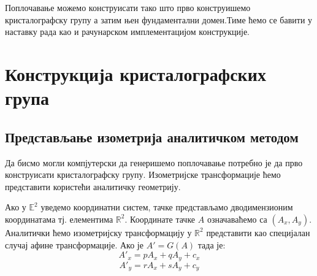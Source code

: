\documentclass[12pt]{article}
\newtheorem{definition}[theorem]{\bf Дефиниција}
\begin{document}
Поплочавање можемо конструисати тако што прво конструишемо кристалографску групу а затим њен фундаментални домен.Тиме ћемо се бавити у наставку рада као и рачунарском имплементацијом конструкције.






    \section{\texorpdfstring{Конструкција кристалографских група
}{Izometrijske transformacije u \textbackslash{}mathbb\{Е\}\^{}2}}\label{izometrijske-transformacije-u-mathbbr2}
\subsection{Представљање изометрија аналитичком методом}

Да бисмо могли компјутерски да генеришемо поплочавање потребно је да прво конструисати кристалографску групу. Изометријске трансформације ћемо представити користећи аналитичку геометрију.




    Ако у \(\mathbb{E}^2\) уведемо координатни систем, тачке представљамо
дводимензионим координатама тј. елементима \(\mathbb{R}^2\). Координате
тачке \(A\) означаваћемо са \((A_x, A_y)\). Аналитички ћемо изометријску
трансформацију у \(\mathbb{R}^2\) представити као специјалан случај
афине трансформације. Ако је \(A' = G(A)\) тада је:
\[A'_x = pA_x + qA_y + c_x\] \[A'_y = rA_x + sA_y + c_y\] 
\end{document}
